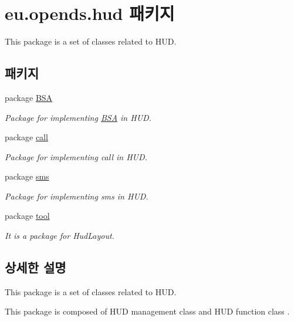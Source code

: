 \hypertarget{namespaceeu_1_1opends_1_1hud}{}\section{eu.\+opends.\+hud 패키지}
\label{namespaceeu_1_1opends_1_1hud}


This package is a set of classes related to H\+U\+D.  


\subsection*{패키지}
\begin{DoxyCompactItemize}
\item 
package \hyperlink{namespaceeu_1_1opends_1_1hud_1_1_b_s_a}{B\+S\+A}
\begin{DoxyCompactList}\small\item\em Package for implementing \hyperlink{namespaceeu_1_1opends_1_1hud_1_1_b_s_a}{B\+S\+A} in H\+U\+D. \end{DoxyCompactList}\item 
package \hyperlink{namespaceeu_1_1opends_1_1hud_1_1call}{call}
\begin{DoxyCompactList}\small\item\em Package for implementing call in H\+U\+D. \end{DoxyCompactList}\item 
package \hyperlink{namespaceeu_1_1opends_1_1hud_1_1sms}{sms}
\begin{DoxyCompactList}\small\item\em Package for implementing sms in H\+U\+D. \end{DoxyCompactList}\item 
package \hyperlink{namespaceeu_1_1opends_1_1hud_1_1tool}{tool}
\begin{DoxyCompactList}\small\item\em It is a package for Hud\+Layout. \end{DoxyCompactList}\end{DoxyCompactItemize}


\subsection{상세한 설명}
This package is a set of classes related to H\+U\+D. 

This package is composed of H\+U\+D management class and H\+U\+D function class . 
